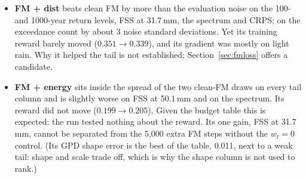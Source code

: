 \documentclass[11pt,a4paper]{article}
\begin{document}
\begin{table}[h]\centering\small{}
\caption{Clean FM and its two fine-tunes on hourly data. One seed per model.}\label{tab:fm}
\end{table}

\begin{itemize}[leftmargin=1.2em]
\item \textbf{FM + dist} beats clean FM by more than the evaluation noise on the 100- and 1000-year return levels, FSS
at 31.7\,mm, the spectrum and CRPS; on the exceedance count by about 3 noise standard deviations. Yet its training
reward barely moved ($0.351\to0.339$), and its gradient was mostly on light rain. Why it helped the tail is not
established; Section~\ref{sec:fmloss} offers a candidate.
\item \textbf{FM + energy} sits inside the spread of the two clean-FM draws on every tail column and is slightly worse on
FSS at 50.1\,mm and on the spectrum. Its reward did not move ($0.199\to0.205$). Given the budget table this is expected:
the run tested nothing about the reward. Its one gain, FSS at 31.7\,mm, cannot be separated from the 5,000 extra FM
steps without the $w_{\mathrm r} = 0$ control. (Its GPD shape error is the best of the table, 0.011, next to a weak
tail: shape and scale trade off, which is why the shape column is not used to rank.)
\end{itemize}
\end{document}
